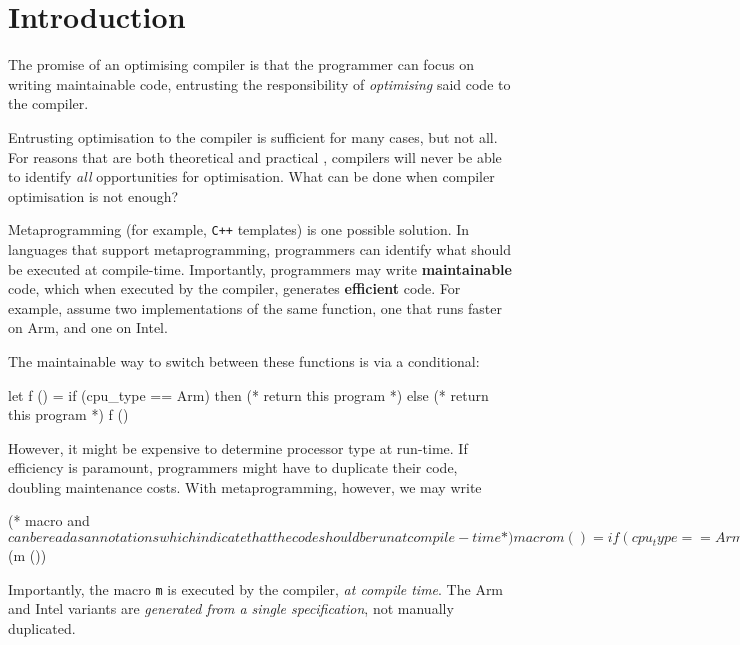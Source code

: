 \chapter{Introduction}

The promise of an optimising compiler is that the programmer can focus on writing maintainable code, entrusting the responsibility of \textit{optimising} said code to the compiler. 

Entrusting optimisation to the compiler is sufficient for many cases, but not all. For reasons that are both theoretical \citep{rice-53} and practical \citep{robinson-01}, compilers will never be able to identify \textit{all} opportunities for optimisation. What can be done when compiler optimisation is not enough?

Metaprogramming (for example, \texttt{C++} templates) \citep{abrahams-04} is one possible solution. In languages that support metaprogramming, programmers can identify what should be executed at compile-time. Importantly, programmers may write \textbf{maintainable} code, which when executed by the compiler, generates \textbf{efficient} code. For example, assume two implementations of the same function, one that runs faster on Arm, and one on Intel.

The maintainable way to switch between these functions is via a conditional:
\begin{ocaml}
let f () = if (cpu_type == Arm) then 
             (* return this program *)
           else 
             (* return this program *)
f ()
\end{ocaml}

However, it might be expensive to determine processor type at run-time. If efficiency is paramount, programmers might have to duplicate their code, doubling maintenance costs. With metaprogramming, however, we may write 
\begin{macocaml}
(* macro and $ can be read as annotations which 
   indicate that the code should be run at compile-time *)
macro m () = if (cpu_type == Arm) then 
               (* generate this program, to be run later *)
             else 
               (* gen this program, to be run later *)
$(m ())
\end{macocaml}
Importantly, the macro \texttt{m} is executed by the compiler, \textit{at compile time}. The Arm and Intel variants are \textit{generated from a single specification}, not manually duplicated.

